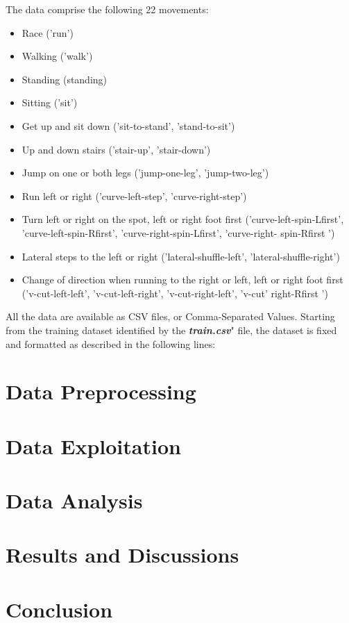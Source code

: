 The data comprise the following 22 movements:
\begin{itemize}
    \item Race ('run')
    \item Walking ('walk')
    \item Standing (standing)
    \item Sitting ('sit')
    \item Get up and sit down ('sit-to-stand', 'stand-to-sit')
    \item Up and down stairs ('stair-up', 'stair-down')
    \item Jump on one or both legs ('jump-one-leg', 'jump-two-leg')
    \item Run left or right ('curve-left-step', 'curve-right-step')
    \item Turn left or right on the spot, left or right foot first ('curve-left-spin-Lfirst',
    'curve-left-spin-Rfirst', 'curve-right-spin-Lfirst', 'curve-right- spin-Rfirst ')
    \item Lateral steps to the left or right ('lateral-shuffle-left', 'lateral-shuffle-right')
    \item Change of direction when running to the right or left, left or right foot first
    ('v-cut-left-left', 'v-cut-left-right', 'v-cut-right-left', 'v-cut' right-Rfirst ')
\end{itemize}

All the data are available as CSV files, or Comma-Separated Values. Starting from the training
dataset identified by the \textbf{\emph{train.csv}}" file, the dataset is fixed and formatted  as
described in the following lines:





\section{Data Preprocessing}

\section{Data Exploitation}

\section{Data Analysis}

\section{Results and Discussions}

\section{Conclusion}

